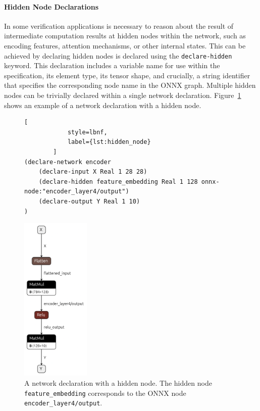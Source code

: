 \paragraph{Hidden Node Declarations}
\label{sec:hidden-node-declarations}
In some verification applications is necessary to reason about the result of intermediate computation results at hidden nodes within the network, such as encoding features, attention mechanisms, or other internal states.
This can be achieved by declaring hidden nodes is declared using the \texttt{declare-hidden} keyword. This declaration includes a variable name for use within the \vnnlib{} specification, 
its element type, its tensor shape, and crucially, a string identifier that specifies the corresponding node name in the ONNX graph.  Multiple
hidden nodes can be trivially declared within a single network declaration. Figure~\ref{fig:hidden_node} shows an example of a \vnnlib{} network declaration with a hidden node.

\begin{figure}[h!]
    \begin{minipage}[c]{0.55\textwidth}
        \begin{lstlisting}[
            style=lbnf,
            label={lst:hidden_node}
        ]
(declare-network encoder
    (declare-input X Real 1 28 28)
    (declare-hidden feature_embedding Real 1 128 onnx-node:"encoder_layer4/output")
    (declare-output Y Real 1 10)
)
        \end{lstlisting}
    \end{minipage}%
    \begin{minipage}[c]{0.45\textwidth}
        \centering
        \includegraphics[height=8cm]{imgs/encoder_net.onnx.png}
    \end{minipage}
    \caption{A \vnnlib{} network declaration with a hidden node. The hidden node \texttt{feature\_embedding} corresponds to the ONNX node \texttt{encoder\_layer4/output}.}
    \label{fig:hidden_node}
\end{figure}

